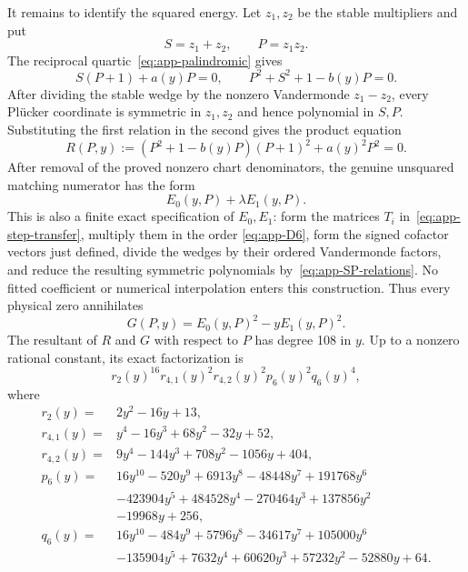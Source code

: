 It remains to identify the squared energy.  Let \(z_1,z_2\) be the stable
multipliers and put
\[
 S=z_1+z_2,\qquad P=z_1z_2.
\]
The reciprocal quartic~\eqref{eq:app-palindromic} gives
\begin{equation}
 S(P+1)+a(y)P=0,\qquad
 P^2+S^2+1-b(y)P=0.                  \label{eq:app-SP-relations}
\end{equation}
After dividing the stable wedge by the nonzero Vandermonde
\(z_1-z_2\), every Pl\"ucker coordinate is symmetric in \(z_1,z_2\) and
hence polynomial in \(S,P\).  Substituting the first relation in the
second gives the product equation
\begin{equation}
 R(P,y):=(P^2+1-b(y)P)(P+1)^2+a(y)^2P^2=0.            \label{eq:app-product-relation}
\end{equation}
After removal of the proved nonzero chart denominators, the genuine
unsquared matching numerator has the form
\[
 E_0(y,P)+\lambda E_1(y,P).
\]
This is also a finite exact specification of \(E_0,E_1\): form the matrices
\(T_i\) in~\eqref{eq:app-step-transfer}, multiply them in the order
\eqref{eq:app-D6}, form the signed cofactor vectors just defined, divide the
wedges by their ordered Vandermonde factors, and reduce the resulting
symmetric polynomials by~\eqref{eq:app-SP-relations}.  No fitted coefficient
or numerical interpolation enters this construction.
Thus every physical zero annihilates
\begin{equation}
 G(P,y)=E_0(y,P)^2-yE_1(y,P)^2.                       \label{eq:app-squared-Evans}
\end{equation}
The resultant of \(R\) and \(G\) with respect to \(P\) has degree 108 in
\(y\).  Up to a nonzero rational constant, its exact factorization is
\begin{equation}
 r_2(y)^{16}r_{4,1}(y)^2r_{4,2}(y)^2p_6(y)^2q_6(y)^4, \label{eq:app-resultant-factorization}
\end{equation}
where
\begin{align*}
r_2(y)={}&2y^2-16y+13,\\
r_{4,1}(y)={}&y^4-16y^3+68y^2-32y+52,\\
r_{4,2}(y)={}&9y^4-144y^3+708y^2-1056y+404,\\
p_6(y)={}&16y^{10}-520y^9+6913y^8-48448y^7+191768y^6\\
&-423904y^5+484528y^4-270464y^3+137856y^2\\
&-19968y+256,\\
q_6(y)={}&16y^{10}-484y^9+5796y^8-34617y^7+105000y^6\\
&-135904y^5+7632y^4+60620y^3+57232y^2-52880y+64.
\end{align*}
